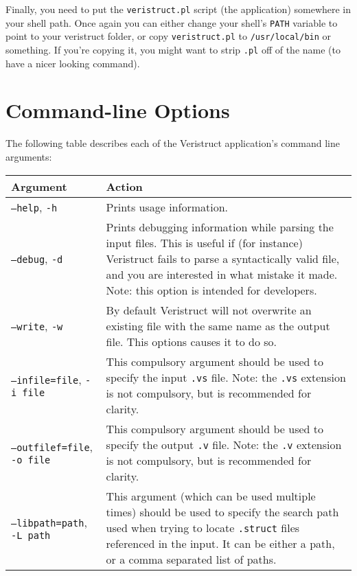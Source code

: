 \documentclass[a4paper]{article} \usepackage[dvips]{graphicx}
\begin{document}
Finally, you need to put the \texttt{veristruct.pl} script (the
application) somewhere in your shell path. Once again you can either
change your shell's \texttt{PATH} variable to point to your veristruct
folder, or copy \texttt{veristruct.pl} to \texttt{/usr/local/bin} or
something. If you're copying it, you might want to strip \texttt{.pl}
off of the name (to have a nicer looking command).

\section{Command-line Options}
\label{sec:options}
The following table describes each of the Veristruct application's
command line arguments:

\begin{center}
  \begin{tabular}{|l|p{10cm}|}
    \hline \textbf{Argument} & \textbf{Action} \\
    \hline \texttt{--help}, \texttt{-h} & Prints usage information. \\
    \hline \texttt{--debug}, \texttt{-d} & Prints debugging information
    while parsing the input files. This is useful if (for instance) Veristruct
    fails to parse a syntactically valid file, and you are interested in what
    mistake it made. Note: this option is intended for developers.\\
    \hline \texttt{--write}, \texttt{-w} & By default Veristruct will not overwrite
    an existing file with the same name as the output file. This options causes
    it to do so.\\
    \hline \texttt{--infile=file}, \texttt{-i file} & This compulsory argument
    should be used to specify the input \texttt{.vs} file. Note: the \texttt{.vs} 
    extension is not compulsory, but is recommended for clarity.\\
    \hline \texttt{--outfilef=file}, \texttt{-o file} & This compulsory argument
    should be used to specify the output \texttt{.v} file. Note: the \texttt{.v}
    extension is not compulsory, but is recommended for clarity.\\
    \hline \texttt{--libpath=path}, \texttt{-L path} & This argument (which can
    be used multiple times) should be used to specify the search path
    used when trying to locate \texttt{.struct} files referenced in the input.
    It can be either a path, or a comma separated list of paths.\\
    \hline
  \end{tabular}
\end{center}
\end{document}

